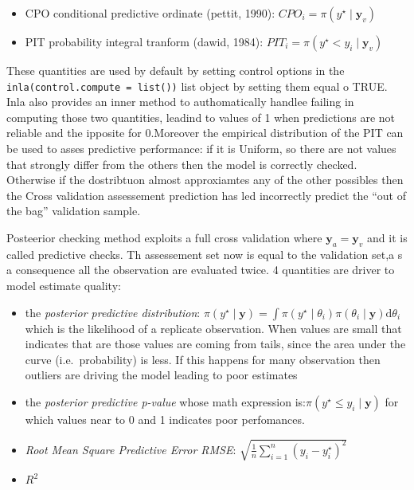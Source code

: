 \documentclass[
  12pt,
  a4paper,
  oneside]{book}
\providecommand{\tightlist}{%
  \setlength{\itemsep}{0pt}\setlength{\parskip}{0pt}}
\theoremstyle{definition}
\theoremstyle{definition}
\theoremstyle{definition}
\theoremstyle{remark}
\begin{document}
\begin{itemize}
\tightlist
\item
  CPO conditional predictive ordinate (pettit, 1990): \(CPO_{i} = \pi(y^{\star} \mid \boldsymbol{y}_{v})\)
\item
  PIT probability integral tranform (dawid, 1984): \(PIT_{i} = \pi(y^{\star} < y_{i} \mid \boldsymbol{y}_{v})\)
\end{itemize}

These quantities are used by default by setting control options in the \texttt{inla(control.compute\ =\ list())} list object by setting them equal o TRUE. Inla also provides an inner method to authomatically handlee failing in computing those two quantities, leadind to values of 1 when predictions are not reliable and the ipposite for 0.Moreover the empirical distribution of the PIT can be used to asses predictive performance: if it is Uniform, so there are not values that strongly differ from the others then the model is correctly checked. Otherwise if the dostribtuon almost approxiamtes any of the other possibles then the Cross validation assessement prediction has led incorrectly predict the ``out of the bag'' validation sample.

Posteerior checking method exploits a full cross validation where \(\boldsymbol{y}_{a} = \boldsymbol{y}_{v}\) and it is called predictive checks. Th assessement set now is equal to the validation set,a s a consequence all the observation are evaluated twice. 4 quantities are driver to model estimate quality:

\begin{itemize}
\tightlist
\item
  the \emph{posterior predictive distribution}: \(\pi(y^{\star} \mid \boldsymbol{y}) = \int \pi(y^{\star} \mid \theta_{i})\pi({\theta_{i}} \mid \boldsymbol{y})\mathrm{d}\theta_{i}\) which is the likelihood of a replicate observation. When values are small that indicates that are those values are coming from tails, since the area under the curve (i.e.~probability) is less. If this happens for many observation then outliers are driving the model leading to poor estimates
\item
  the \emph{posterior predictive p-value} whose math expression is:\(\pi(y^{\star} \leq y_{i} \mid \boldsymbol{y})\) for which values near to 0 and 1 indicates poor perfomances.
\item
  \emph{Root Mean Square Predictive Error RMSE}: \(\sqrt{\frac{1}{n} \sum_{i=1}^{n}(y_{i}-{y}^{\star}_{i})^{2}}\)
\item
  \(R^2\)
\end{itemize}
\end{document}
